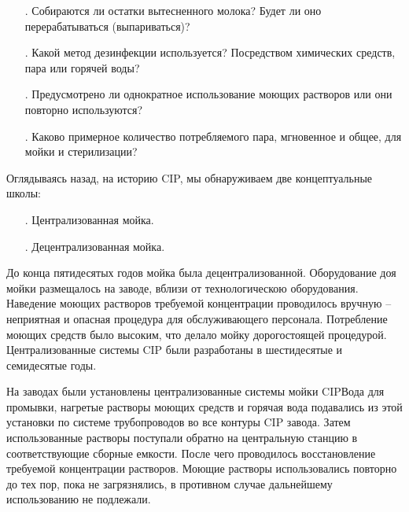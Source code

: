 {\begin{itemize}[leftmargin=2.15cm, labelwidth=0.65cm, labelsep=0.0cm]
	\item[\theitemcntr. ] Собираются ли остатки вытесненного молока? Будет ли оно перерабатываться (выпариваться)?
	\addtocounter{itemcntr}{1}
	
	\item[\theitemcntr. ] Какой метод дезинфекции используется? Посредством химических средств, пара или горячей воды?
	\addtocounter{itemcntr}{1}
	
	\item[\theitemcntr. ] Предусмотрено ли однократное использование моющих растворов или они повторно используются?
	\addtocounter{itemcntr}{1}
	
	\item[\theitemcntr. ] Каково примерное количество потребляемого пара, мгновенное и общее, для мойки и стерилизации?
	\addtocounter{itemcntr}{1}
	
	\setcounter{itemcntr}{1}
\end{itemize}

\par \redline Оглядываясь назад, на историю CIP, мы обнаруживаем две концептуальные школы:

\begin{itemize}[leftmargin=2.15cm, labelwidth=0.65cm, labelsep=0.0cm] 
	
	\item[\theitemcntr. ] Централизованная мойка.
	\addtocounter{itemcntr}{1}
	
	\item[\theitemcntr. ] Децентрализованная мойка.
	\addtocounter{itemcntr}{1}
	
	\addtocounter{itemcntr}{1}
	
	\setcounter{itemcntr}{1}
\end{itemize}

\par \redline До конца пятидесятых годов мойка была децентрализованной. Оборудование доя мойки размещалось на заводе, вблизи от технологическою оборудования. Наведение моющих растворов требуемой концентрации проводилось вручную {--} неприятная и опасная процедура для обслуживающего персонала. Потребление моющих средств было высоким, что делало мойку дорогостоящей процедурой.
Централизованные системы CIP были разработаны в шестидесятые и семидесятые годы.

\par \redline На заводах были установлены централизованные системы мойки CIPВода для промывки, нагретые растворы моющих средств и горячая вода подавались из этой установки по системе трубопроводов во все контуры CIP завода. Затем использованные растворы поступали обратно на центральную станцию в соответствующие сборные емкости. После чего проводилось восстановление требуемой концентрации растворов. Моющие растворы использовались повторно до тех пор, пока не загрязнялись, в противном случае дальнейшему использованию не подлежали.

}

